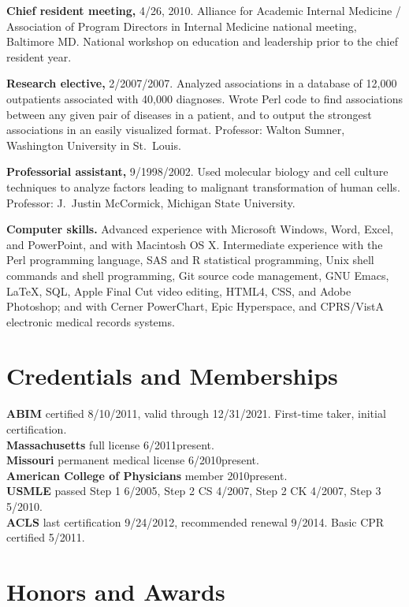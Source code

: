 \documentclass[12pt]{article}
\begin{document}
\textbf{Chief resident meeting,} 4/26, 2010. Alliance for
Academic Internal Medicine / Association of Program Directors in
Internal Medicine national meeting, Baltimore MD. National workshop on
education and leadership prior to the chief resident year.

\textbf{Research elective,} 2/2007/2007. Analyzed associations
in a database of 12,000 outpatients associated with 40,000 diagnoses.
Wrote Perl code to find associations between any given pair of
diseases in a patient, and to output the strongest associations in an
easily visualized format. Professor: Walton Sumner, Washington
University in St.\ Louis.

\textbf{Professorial assistant,} 9/1998/2002. Used molecular
biology and cell culture techniques to analyze factors leading to
malignant transformation of human cells. Professor: J.\ Justin
McCormick, Michigan State University.

\textbf{Computer skills.} Advanced experience with Microsoft Windows, Word,
Excel, and PowerPoint, and with Macintosh OS X. Intermediate
experience with the Perl programming language, SAS and R statistical
programming, Unix shell commands and shell programming, Git source
code management, GNU Emacs, \LaTeX, SQL, Apple Final Cut video editing,
HTML4, CSS, and Adobe Photoshop; and with Cerner PowerChart, Epic
Hyperspace, and CPRS/VistA electronic medical records systems.

\section*{Credentials and Memberships}

\textbf{ABIM} certified 8/10/2011, valid through 12/31/2021. First-time taker,
initial certification.\\
\textbf{Massachusetts} full license 6/2011\ndash{}present.\\
\textbf{Missouri} permanent medical license 6/2010\ndash{}present.\\
\textbf{American College of Physicians} member 2010\ndash{}present.\\
\textbf{USMLE} passed Step 1 6/2005, Step 2 CS 4/2007, Step 2 CK 4/2007, Step 3
5/2010.\\
\textbf{ACLS} last certification 9/24/2012, recommended renewal
9/2014. Basic CPR certified 5/2011.

\section*{Honors and Awards}
\end{document}
